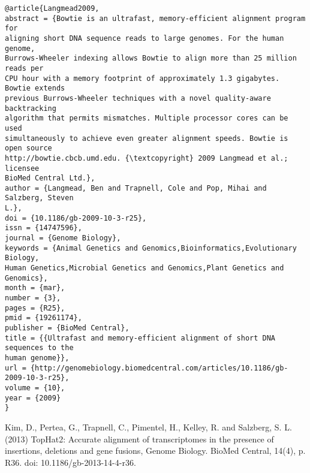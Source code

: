 \documentclass[]{article}
\begin{document}
\begin{verbatim}
@article{Langmead2009,
abstract = {Bowtie is an ultrafast, memory-efficient alignment program for
aligning short DNA sequence reads to large genomes. For the human genome,
Burrows-Wheeler indexing allows Bowtie to align more than 25 million reads per
CPU hour with a memory footprint of approximately 1.3 gigabytes. Bowtie extends
previous Burrows-Wheeler techniques with a novel quality-aware backtracking
algorithm that permits mismatches. Multiple processor cores can be used
simultaneously to achieve even greater alignment speeds. Bowtie is open source
http://bowtie.cbcb.umd.edu. {\textcopyright} 2009 Langmead et al.; licensee
BioMed Central Ltd.},
author = {Langmead, Ben and Trapnell, Cole and Pop, Mihai and Salzberg, Steven 
L.},
doi = {10.1186/gb-2009-10-3-r25},
issn = {14747596},
journal = {Genome Biology},
keywords = {Animal Genetics and Genomics,Bioinformatics,Evolutionary Biology,
Human Genetics,Microbial Genetics and Genomics,Plant Genetics and Genomics},
month = {mar},
number = {3},
pages = {R25},
pmid = {19261174},
publisher = {BioMed Central},
title = {{Ultrafast and memory-efficient alignment of short DNA sequences to the
human genome}},
url = {http://genomebiology.biomedcentral.com/articles/10.1186/gb-2009-10-3-r25},
volume = {10},
year = {2009}
}

\end{verbatim}

Kim, D., Pertea, G., Trapnell, C., Pimentel, H., Kelley, R. and Salzberg, S. L. (2013) TopHat2: Accurate alignment of transcriptomes in the presence of insertions, deletions and gene fusions, Genome Biology. BioMed Central, 14(4), p. R36. doi: 10.1186/gb-2013-14-4-r36.
\end{document}
